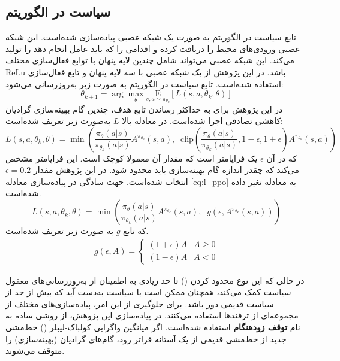 \subsection{
    سیاست در الگوریتم 
}
تابع سیاست در الگوریتم  به صورت یک شبکه عصبی پیاده‌سازی شده‌است. این شبکه عصبی ورودی‌های محیط را دریافت کرده و اقدامی را که باید عامل انجام دهد را تولید می‌کند. این شبکه عصبی می‌تواند شامل چندین لایه پنهان با توابع فعال‌سازی مختلف باشد. در این پژوهش از یک شبکه عصبی با سه لایه پنهان و تابع فعال‌سازی 
\(\mathrm{ReLu}\)
استفاده شده‌است.
تابع سیاست در الگوریتم  به صورت زیر به‌روز‌رسانی می‌شود:
\begin{equation}
    \theta_{k+1} = \arg \max_{\theta} \underset{s,a \sim \pi_{\theta_k}}{{\mathrm E}}\left[
        L(s,a,\theta_k, \theta)\right]
\end{equation}
در این پژوهش برای به حداکثر رساندن تابع هدف، چندین گام بهینه‌سازی 
گرادیان کاهشی تصادفی
اجرا شده‌است.
در معادله بالا
\(L\)
به‌صورت زیر تعریف شده‌است:
\begin{equation}
	\label{eq:l_ppo}
    L(s,a,\theta_k,\theta) = \min\left(
    \frac{\pi_{\theta}(a|s)}{\pi_{\theta_k}(a|s)}  A^{\pi_{\theta_k}}(s,a), \;\;
    \text{clip}\left(\frac{\pi_{\theta}(a|s)}{\pi_{\theta_k}(a|s)}, 1 - \epsilon, 1+\epsilon \right) A^{\pi_{\theta_k}}(s,a)
    \right)
\end{equation}
که در آن
\(\epsilon\)
یک فراپامتر است که مقدار آن معمولا کوچک است.
این فراپامتر مشخص می‌کند که چقدر اندازه گام بهینه‌سازی باید محدود شود.
در این پژوهش مقدار 
\(\epsilon = 0.2\)
انتخاب شده‌است. جهت سادگی در پیاده‌سازی معادله \eqref{eq:l_ppo} به معادله تغیر داده شده‌است.
\begin{equation}
	L(s,a,\theta_k,\theta) = \min\left(
	\frac{\pi_{\theta}(a|s)}{\pi_{\theta_k}(a|s)}  A^{\pi_{\theta_k}}(s,a), \;\;
	g(\epsilon, A^{\pi_{\theta_k}}(s,a))
	\right)
\end{equation}
که تابع \(g\) به صورت زیر تعریف شده‌است.
\begin{align}
	g(\epsilon, A) = \left\{
	\begin{array}{ll}
		(1 + \epsilon) A & A \geq 0 \\
		(1 - \epsilon) A & A < 0
	\end{array}
	\right.
\end{align}

در حالی که این نوع محدود کردن 
()
 تا حد زیادی به اطمینان از به‌روزرسانی‌های معقول سیاست کمک می‌کند، همچنان ممکن است با سیاست به‌دست آید که بیش از حد از سیاست قدیمی دور باشد. برای جلوگیری از این امر، پیاده‌سازی‌های مختلف  از مجموعه‌ای از ترفندها استفاده می‌کنند. در پیاده‌سازی این پژوهش، از روشی ساده به نام
  \textbf{توقف زودهنگام}
   استفاده شده‌است. اگر میانگین واگرایی کولباک-لیبلر () خط‌مشی جدید از خط‌مشی قدیمی از یک آستانه فراتر رود، گام‌های گرادیان (بهینه‌سازی) را متوقف می‌شوند. 
   
